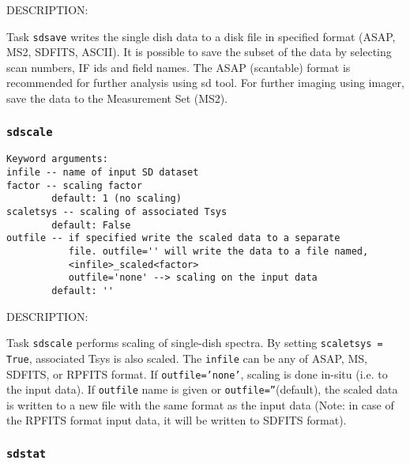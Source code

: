           DESCRIPTION:

          Task {\tt sdsave} writes the single dish data to a disk file in 
          specified format (ASAP, MS2, SDFITS, ASCII). It is possible to
          save the subset of the data by selecting scan numbers, IF ids
          and field names. The ASAP (scantable) format is recommended for
          further analysis using sd tool. For further imaging using imager,
          save the data to the Measurement Set (MS2).

\subsubsection{{\tt sdscale}}
\label{section:sd.sdtasks.tasks.sdscale}

\begin{verbatim}
Keyword arguments:
infile -- name of input SD dataset
factor -- scaling factor
        default: 1 (no scaling)
scaletsys -- scaling of associated Tsys
        default: False
outfile -- if specified write the scaled data to a separate 
           file. outfile='' will write the data to a file named,
           <infile>_scaled<factor>
           outfile='none' --> scaling on the input data
        default: ''

\end{verbatim}

    DESCRIPTION:

    Task {\tt sdscale} performs scaling of single-dish spectra.
    By setting {\tt scaletsys = True}, associated Tsys is also scaled.
    The {\tt infile} can be any of ASAP, MS, SDFITS, or RPFITS format.
    If {\tt outfile='none'}, scaling is done in-situ (i.e. to the input data).
    If {\tt outfile} name is given or {\tt outfile=''}(default), the scaled data is written
    to a new file with the same format as the input data (Note: in case of the
    RPFITS format input data, it will be written to SDFITS format).

\subsubsection{{\tt sdstat}}
\label{section:sd.sdtasks.tasks.sdstat}

